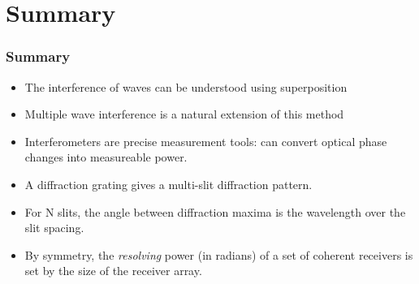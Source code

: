 \documentclass[pdf, handout, hideothersubsections]{beamer}
\begin{document}
\section{Summary}
\begin{frame}
\frametitle{Summary}
\begin{itemize}
  \item The interference of waves can be understood using superposition
  \item Multiple wave interference is a natural extension of this method
  \item Interferometers are precise measurement tools: can convert
    optical phase changes into measureable power.

  \item A diffraction grating gives a multi-slit diffraction pattern.
  \item For N slits, the angle between diffraction maxima is the
    wavelength over the slit spacing.
  \item By symmetry, the \emph{resolving} power (in radians) of a set
    of coherent receivers is set by the size of the receiver array.

\end{itemize}
\end{frame}
\end{document}
